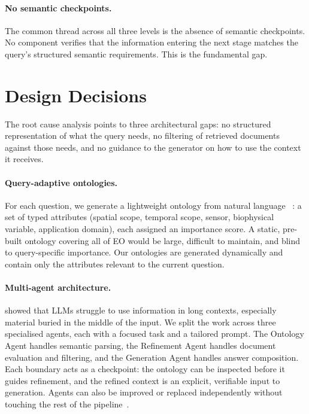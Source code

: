 \paragraph{No semantic checkpoints.} The common thread across all three levels is the absence of semantic checkpoints. No component verifies that the information entering the next stage matches the query's structured semantic requirements. This is the fundamental gap.

\section{Design Decisions}
\label{sec:design-decisions}

The root cause analysis points to three architectural gaps: no structured representation of what the query needs, no filtering of retrieved documents against those needs, and no guidance to the generator on how to use the context it receives.

\paragraph{Query-adaptive ontologies.} For each question, we generate a lightweight ontology from natural language ~\citep{berant2013semantic}: a set of typed attributes (spatial scope, temporal scope, sensor, biophysical variable, application domain), each assigned an importance score. A static, pre-built ontology covering all of EO would be large, difficult to maintain, and blind to query-specific importance. Our ontologies are generated dynamically and contain only the attributes relevant to the current question.

\paragraph{Multi-agent architecture.} \citet{liu2024lost} showed that LLMs struggle to use information in long contexts, especially material buried in the middle of the input. We split the work across three specialised agents, each with a focused task and a tailored prompt. The Ontology Agent handles semantic parsing, the Refinement Agent handles document evaluation and filtering, and the Generation Agent handles answer composition. Each boundary acts as a checkpoint: the ontology can be inspected before it guides refinement, and the refined context is an explicit, verifiable input to generation. Agents can also be improved or replaced independently without touching the rest of the pipeline~\citep{pan2023multiagent, zhao2025marag}.

